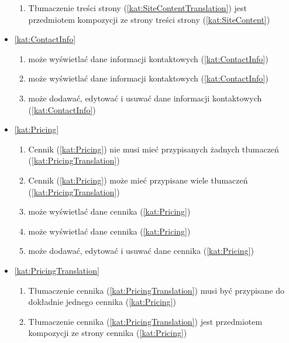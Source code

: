 \begin{itemize}[label={\textbf{Reguły dla}}, wide, labelwidth=!, labelindent=0pt]
\begin{enumerate}[label={\textbf{REG/\protect\threedigits{\arabic{enumi}}}}, wide, labelwidth=!, align=left, leftmargin=3cm, resume]
        \item Tłumaczenie treści strony (\ref{kat:SiteContentTranslation}) jest przedmiotem kompozycji ze strony treści strony (\ref{kat:SiteContent})
    \end{enumerate}
    \item\ref{kat:ContactInfo}
    \begin{enumerate}[label={\textbf{REG/\protect\threedigits{\arabic{enumi}}}}, wide, labelwidth=!, align=left, leftmargin=3cm, resume]
        \item {} może wyświetlać dane informacji kontaktowych (\ref{kat:ContactInfo})
        \item {} może wyświetlać dane informacji kontaktowych (\ref{kat:ContactInfo})
        \item {} może dodawać, edytować i usuwać dane informacji kontaktowych (\ref{kat:ContactInfo})
    \end{enumerate}
    \item\ref{kat:Pricing}
    \begin{enumerate}[label={\textbf{REG/\protect\threedigits{\arabic{enumi}}}}, wide, labelwidth=!, align=left, leftmargin=3cm, resume]
        \item Cennik (\ref{kat:Pricing}) nie musi mieć przypisanych żadnych tłumaczeń (\ref{kat:PricingTranslation})
        \item Cennik (\ref{kat:Pricing}) może mieć przypisane wiele tłumaczeń (\ref{kat:PricingTranslation})
        \item {} może wyświetlać dane cennika (\ref{kat:Pricing})
        \item {} może wyświetlać dane cennika (\ref{kat:Pricing})
        \item {} może dodawać, edytować i usuwać dane cennika (\ref{kat:Pricing})
    \end{enumerate}
    \item\ref{kat:PricingTranslation}
    \begin{enumerate}[label={\textbf{REG/\protect\threedigits{\arabic{enumi}}}}, wide, labelwidth=!, align=left, leftmargin=3cm, resume]
        \item Tłumaczenie cennika (\ref{kat:PricingTranslation}) musi być przypisane do dokładnie jednego cennika (\ref{kat:Pricing})
        \item Tłumaczenie cennika (\ref{kat:PricingTranslation}) jest przedmiotem kompozycji ze strony cennika (\ref{kat:Pricing})

\end{enumerate}
\end{itemize}
